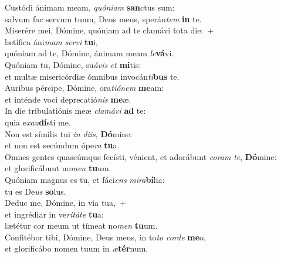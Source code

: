 \evenverse Custódi ánimam meam, \textit{quó}\textit{ni}\textit{am} \textbf{san}ctus sum:~\*\\
\evenverse salvum fac servum tuum, Deus meus, sperán\textit{tem} \textbf{in} te.\\
\oddverse Miserére mei, Dómine, quóniam ad te clamávi tota die:~+\\
\oddverse  lætífica áni\textit{mam} \textit{ser}\textit{vi} \textbf{tu}i,~\*\\
\oddverse quóniam ad te, Dómine, ánimam meam \textit{le}\textbf{vá}vi.\\
\evenverse Quóniam tu, Dómine, su\textit{á}\textit{vis} \textit{et} \textbf{mi}tis:~\*\\
\evenverse et multæ misericórdiæ ómnibus invocán\textit{ti}\textbf{bus} te.\\
\oddverse Auribus pércipe, Dómine, ora\textit{ti}\textit{ó}\textit{nem} \textbf{me}am:~\*\\
\oddverse et inténde voci deprecatió\textit{nis} \textbf{me}æ.\\
\evenverse In die tribulatiónis meæ \textit{cla}\textit{má}\textit{vi} \textbf{ad} te:~\*\\
\evenverse quia e\textit{xau}\textbf{dí}sti me.\\
\oddverse Non est símilis tui \textit{in} \textit{di}\textit{is}, \textbf{Dó}mine:~\*\\
\oddverse et non est secúndum ópe\textit{ra} \textbf{tu}a.\\
\evenverse Omnes gentes quascúmque fecísti, vénient, et adorábunt \textit{co}\textit{ram} \textit{te}, \textbf{Dó}mine:~\*\\
\evenverse et glorificábunt no\textit{men} \textbf{tu}um.\\
\oddverse Quóniam magnus es tu, et fáci\textit{ens} \textit{mi}\textit{ra}\textbf{bí}lia:~\*\\
\oddverse tu es De\textit{us} \textbf{so}lus.\\
\evenverse Deduc me, Dómine, in via tua,~+\\
\evenverse  et ingrédiar in ve\textit{ri}\textit{tá}\textit{te} \textbf{tu}a:~\*\\
\evenverse lætétur cor meum ut tímeat no\textit{men} \textbf{tu}um.\\
\oddverse Confitébor tibi, Dómine, Deus meus, in to\textit{to} \textit{cor}\textit{de} \textbf{me}o,~\*\\
\oddverse et glorificábo nomen tuum in \textit{æ}\textbf{tér}num.\\
